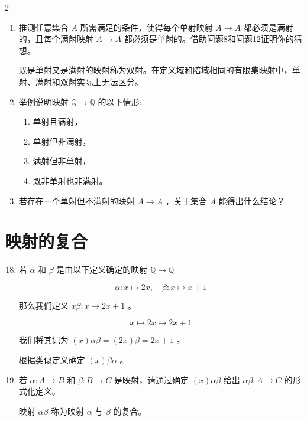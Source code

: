 \documentclass[12pt]{ctexart}
\begin{document}
\begin{multicols}{2}
\begin{enumerate}
\item  推测任意集合 \(A\) 所需满足的条件，使得每个单射映射 \(A \rightarrow  A\) 都必须是满射的，且每个满射映射 \(A \rightarrow  A\) 都必须是单射的。借助问题8和问题12证明你的猜想。

既是单射又是满射的映射称为双射。在定义域和陪域相同的有限集映射中，单射、满射和双射实际上无法区分。

\item  举例说明映射 \(\mathbb{Q} \rightarrow  \mathbb{Q}\) 的以下情形:
\begin{enumerate}
\item 单射且满射，

\item  单射但非满射，

\item  满射但非单射，

\item  既非单射也非满射。
\end{enumerate}
 
\item 若存在一个单射但不满射的映射 \(A \rightarrow  A\) ，关于集合 \(A\) 能得出什么结论？

\end{enumerate}

\section*{映射的复合}

\begin{enumerate}
  \setcounter{enumi}{17}
\item 若 \(\alpha\) 和 \(\beta\) 是由以下定义确定的映射 \(\mathbb{Q} \rightarrow  \mathbb{Q}\)

\[\alpha  : x \mapsto  {2x}, \quad \beta  : x \mapsto  x + 1\]

那么我们定义 \({x\beta } : x \mapsto  {2x} + 1\) 。

\[
x \mapsto  {2x} \mapsto  {2x} + 1
\]

我们将其记为 \(\left( x\right) {\alpha \beta } = \left( {2x}\right) \beta  = {2x} + 1\) 。

根据类似定义确定 \(\left( x\right) {\beta \alpha}\) 。

\item  若 \(\alpha  : A \rightarrow  B\) 和 \(\beta  : B \rightarrow  C\) 是映射，请通过确定 \(\left( x\right) {\alpha \beta }\) 给出 \({\alpha \beta } : A \rightarrow  C\) 的形式化定义。

映射 \({\alpha \beta }\) 称为映射 \(\alpha\) 与 \(\beta\) 的复合。


\end{enumerate}
\end{multicols}
\end{document}
